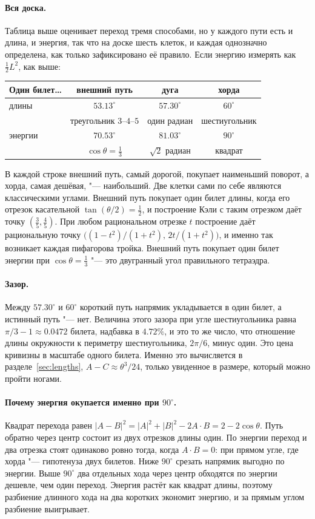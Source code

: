 \paragraph{Вся доска.} Таблица выше оценивает переход тремя способами, но у каждого
пути есть и длина, и энергия, так что на доске шесть клеток, и каждая однозначно определена,
как только зафиксировано её правило. Если энергию измерять как $\tfrac12L^2$, как выше:
\begin{center}\small
\begin{tabular}{lccc}\toprule
Один билет\ldots & внешний путь & дуга & хорда \\ \midrule
длины & $53.13^\circ$ & $57.30^\circ$ & $60^\circ$ \\
 & треугольник $3$--$4$--$5$ & один радиан & шестиугольник \\[2pt]
энергии & $70.53^\circ$ & $81.03^\circ$ & $90^\circ$ \\
 & $\cos\theta=\tfrac13$ & $\sqrt2$ радиан & квадрат \\
\bottomrule\end{tabular}
\end{center}
В каждой строке внешний путь, самый дорогой, покупает наименьший поворот, а хорда, самая
дешёвая, "--- наибольший. Две клетки сами по себе являются классическими углами.
Внешний путь покупает один билет длины, когда его отрезок касательной $\tan(\theta/2)=\tfrac12$, и
построение Кэли с таким отрезком даёт точку $(\tfrac35,\tfrac45)$. При любом рациональном
отрезке $t$ построение даёт рациональную точку $\bigl((1-t^2)/(1+t^2),\,2t/(1+t^2)\bigr)$,
и именно так возникает каждая пифагорова тройка. Внешний путь покупает один билет энергии при
$\cos\theta=\tfrac13$ "--- это двугранный угол правильного тетраэдра.

\paragraph{Зазор.} Между $57.30^\circ$ и $60^\circ$ короткий путь напрямик укладывается в один
билет, а истинный путь "--- нет. Величина этого зазора при угле шестиугольника равна
$\pi/3-1\approx0.0472$ билета, надбавка в $4.72\%$, и это то же число, что
отношение длины окружности к периметру шестиугольника, $2\pi/6$, минус один. Это
цена кривизны в масштабе одного билета. Именно это вычисляется в разделе~\ref{sec:lengths},
$A-C\approx\theta^3/24$, только увиденное в размере, который можно пройти ногами.

\paragraph{Почему энергия окупается именно при $90^\circ$.} Квадрат перехода равен
$|A-B|^2=|A|^2+|B|^2-2A\cdot B=2-2\cos\theta$. Путь обратно через центр состоит из двух
отрезков длины один. По энергии переход и два отрезка стоят одинаково ровно тогда, когда
$A\cdot B=0$: при прямом угле, где хорда "--- гипотенуза двух билетов.
Ниже $90^\circ$ срезать напрямик выгодно по энергии. Выше $90^\circ$ два отдельных хода
через центр обходятся по энергии дешевле, чем один переход. Энергия растёт как
квадрат длины, поэтому разбиение длинного хода на два коротких экономит энергию, и за
прямым углом разбиение выигрывает.

